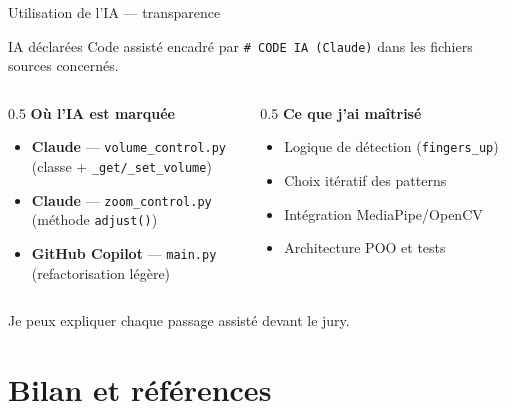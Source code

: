 \documentclass[aspectratio=169,12pt]{beamer}
\begin{document}
\begin{frame}{Utilisation de l'IA --- transparence}
  \begin{block}{IA d\'eclar\'ees}
    Code assist\'e encadr\'e par \texttt{\# CODE IA (Claude)} dans les fichiers sources concern\'es.
  \end{block}
  \vspace{0.15cm}
  \begin{columns}[T]
    \begin{column}{0.5\textwidth}
      \textbf{O\`u l'IA est marqu\'ee}
      \begin{itemize}
        \item \textbf{Claude} --- \texttt{volume\_control.py}\\(classe + \texttt{\_get/\_set\_volume})
        \item \textbf{Claude} --- \texttt{zoom\_control.py}\\(m\'ethode \texttt{adjust()})
        \item \textbf{GitHub Copilot} --- \texttt{main.py}\\(refactorisation l\'eg\`ere)
      \end{itemize}
    \end{column}
    \begin{column}{0.5\textwidth}
      \textbf{Ce que j'ai ma\^itris\'e}
      \begin{itemize}
        \item Logique de d\'etection (\texttt{fingers\_up})
        \item Choix it\'eratif des patterns
        \item Int\'egration MediaPipe/OpenCV
        \item Architecture POO et tests
      \end{itemize}
    \end{column}
  \end{columns}
  \vspace{0.15cm}
  \begin{center}
    \small Je peux expliquer chaque passage assist\'e devant le jury.
  \end{center}
\end{frame}

\section{Bilan et r\'ef\'erences}
\end{document}
